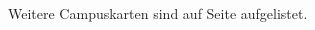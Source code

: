 \documentclass[]{papertex}
\begin{document}
  \begin{multicols}{2}
  
  
  \thispagestyle{empty}
  \begin{figure}[t]
    \label{plan}
    Weitere Campuskarten sind auf Seite \pageref{campuskarte} aufgelistet.
  \end{figure}
  \clearpage
  \setcounter{page}{1}
  
\end{multicols}
  \newpage
  \clearpage
  \newpage
    \begin{multicols}{2}
  
  
  
   
  
  
  
  
  \end{multicols}
\end{document}
